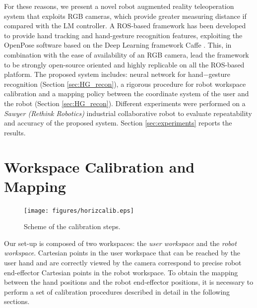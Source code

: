 \documentclass[a4paper, 10pt, conference]{ieeeconf}      %
\begin{document}
For these reasons, we present a novel robot augmented reality teleoperation system that exploits RGB cameras, which provide greater measuring distance if compared with the LM controller. A ROS-based framework has been developed to provide hand tracking and hand-gesture recognition features, exploiting the OpenPose software \cite{simon2017hand, cao2018openpose} based on the Deep Learning framework Caffe \cite{jia2014caffe}.
This, in combination with the ease of availability of an RGB camera, lead the framework to be strongly open-source oriented and highly replicable on all the ROS-based platform. The proposed system includes: neural network for hand$-$gesture recognition (Section \ref{sec:HG_recon}), a rigorous procedure for robot workspace calibration and a mapping policy between the coordinate system of the user and the robot (Section \ref{sec:HG_recon}). 
Different experiments were performed on a \textit{Sawyer (Rethink Robotics)} industrial collaborative robot to evaluate repeatability and accuracy of the proposed system. Section \ref{sec:experiments} reports the results.

\section{Workspace Calibration and Mapping} \label{sec:calib}

\begin{figure}[t]
\centering
  \texttt{[image: figures/horizcalib.eps]}
  \caption{Scheme of the calibration steps.}
  \label{fig:wscalib}
\end{figure}

Our set-up is composed of two workspaces: the \textit{user workspace} and the \textit{robot workspace}. Cartesian points in the user workspace that can be reached by the user hand and are correctly viewed by the camera correspond to precise robot end-effector Cartesian points in the robot workspace. To obtain the mapping between the hand positions and the robot end-effector positions, it is necessary to perform a set of calibration procedures described in detail in the following sections.
\end{document}
